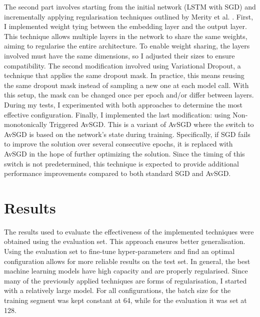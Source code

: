\documentclass[a4paper]{article}
\begin{document}
The second part involves starting from the initial network (LSTM with SGD) and incrementally applying regularisation techniques outlined by Merity et al. \cite{merity2017regularizing}.
First, I implemented weight tying between the embedding layer and the output layer.
This technique allows multiple layers in the network to share the same weights, aiming to regularise the entire architecture.
To enable weight sharing, the layers involved must have the same dimensions, so I adjusted their sizes to ensure compatibility.
The second modification involved using Variational Dropout, a technique that applies the same dropout mask.
In practice, this means reusing the same dropout mask instead of sampling a new one at each model call.
With this setup, the mask can be changed once per epoch and/or differ between layers.
During my tests, I experimented with both approaches to determine the most effective configuration.
Finally, I implemented the last modification: using Non-monotonically Triggered AvSGD. This is a variant of AvSGD where the switch to AvSGD is based on the network’s state during training.
Specifically, if SGD fails to improve the solution over several consecutive epochs, it is replaced with AvSGD in the hope of further optimizing the solution.
Since the timing of this switch is not predetermined, this technique is expected to provide additional performance improvements compared to both standard SGD and AvSGD.

\section{Results}
The results used to evaluate the effectiveness of the implemented techniques were obtained using the evaluation set. This approach ensures better generalisation. Using the evaluation set to fine-tune hyper-parameters and find an optimal configuration allows for more reliable results on the test set.
In general, the best machine learning models have high capacity and are properly regularised. Since many of the previously applied techniques are forms of regularisation, I started with a relatively large model.
For all configurations, the batch size for the training segment was kept constant at 64, while for the evaluation it was set at 128.
\end{document}

